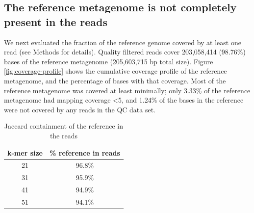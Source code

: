 \documentclass[10pt,a4paper,twocolumn]{article}
\begin{document}


\subsection*{The reference metagenome is not completely present in the reads}

We next evaluated the fraction of the reference genome covered by at least
one read (see Methods for details). Quality filtered reads cover
203,058,414 (98.76\%) bases of the reference metagenome (205,603,715
bp total size).  Figure \ref{fig:coverage-profile} shows the
cumulative coverage profile of the reference metagenome, and the
percentage of bases with that coverage. Most of the reference
metagenome was covered at least minimally; only 3.33\% of the
reference metagenome had mapping coverage \textless 5, and 1.24\% of
the bases in the reference were not covered by any reads in the QC data
set.

\begin{table}[t]
\caption{Jaccard containment of the reference in the reads}
\centering
\begin{tabular}{|c|c|}
\hline
\textbf{k-mer size} & {\textbf \% reference in reads } \\ [0.5ex]
\hline
21 & 96.8\% \\
\hline
31 & 95.9\% \\
\hline
41 & 94.9\% \\
\hline
51 & 94.1\% \\
\hline
\end{tabular}
\label{table:ref_in_reads}
\end{table}
\end{document}
